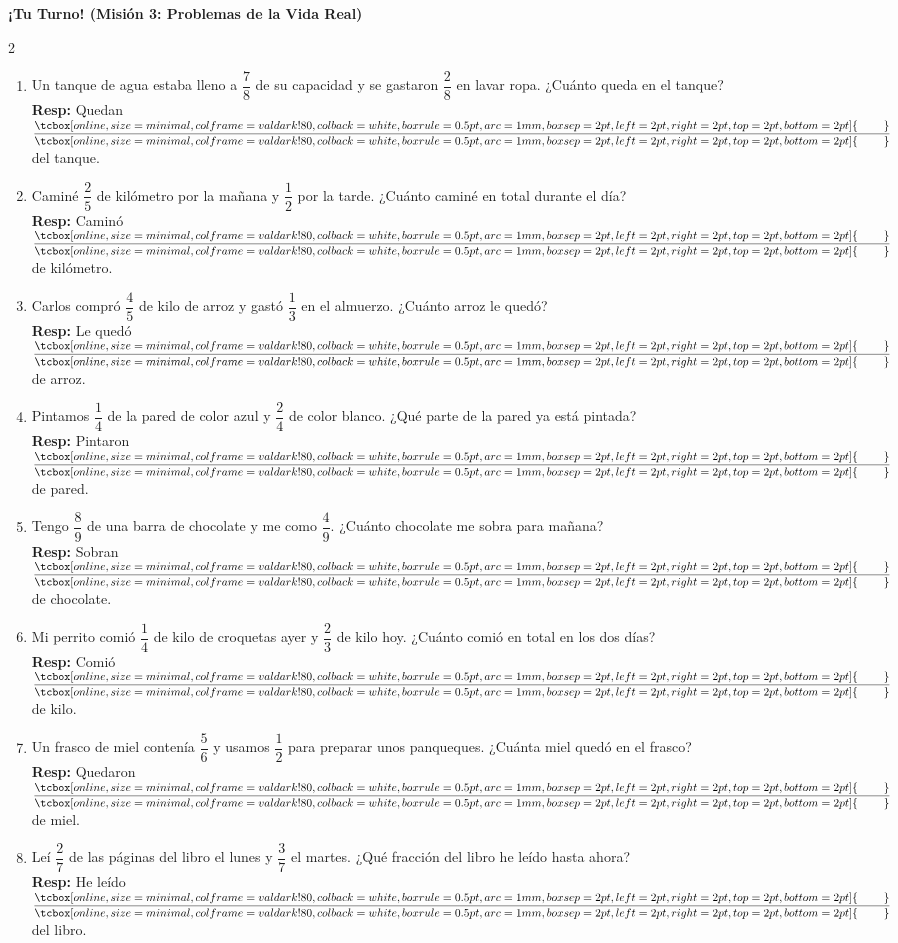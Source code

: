\documentclass[12pt, letterpaper]{article}
\newenvironment{practica}[1]{
	\vspace{0.6cm}
	\begin{tcolorbox}[colback=white, colframe=valdark, boxrule=1pt, borderline west={4pt}{0pt}{valdark!50}, arc=2mm, top=3pt, bottom=3pt]
		\large\bfseries \ding{46} \textbf{¡Tu Turno! (#1)}
	\end{tcolorbox}
	\vspace{0.2cm}
}{
	\vspace{0.4cm}
}
\newcommand{\boxfill}[1][0.6cm]{\tcbox[on line, size=minimal, colframe=valdark!80, colback=white, boxrule=0.5pt, arc=1mm, boxsep=2pt, left=2pt, right=2pt, top=2pt, bottom=2pt]{\makebox[#1]{\vphantom{M}}}}
\begin{document}
\begin{practica}{Misión 3: Problemas de la Vida Real}
\begin{multicols}{2}
\begin{enumerate}[itemsep=1cm, leftmargin=*]
				\item Un tanque de agua estaba lleno a $\dfrac{7}{8}$ de su capacidad y se gastaron $\dfrac{2}{8}$ en lavar ropa. ¿Cuánto queda en el tanque? \\
				\textbf{Resp:} Quedan $\dfrac{\boxfill[0.8cm]}{\boxfill[0.8cm]}$ del tanque.
				
				\item Caminé $\dfrac{2}{5}$ de kilómetro por la mañana y $\dfrac{1}{2}$ por la tarde. ¿Cuánto caminé en total durante el día? \\
				\textbf{Resp:} Caminó $\dfrac{\boxfill[0.8cm]}{\boxfill[0.8cm]}$ de kilómetro.
				
				\item Carlos compró $\dfrac{4}{5}$ de kilo de arroz y gastó $\dfrac{1}{3}$ en el almuerzo. ¿Cuánto arroz le quedó? \\
				\textbf{Resp:} Le quedó $\dfrac{\boxfill[0.8cm]}{\boxfill[0.8cm]}$ de arroz.
				
				\item Pintamos $\dfrac{1}{4}$ de la pared de color azul y $\dfrac{2}{4}$ de color blanco. ¿Qué parte de la pared ya está pintada? \\
				\textbf{Resp:} Pintaron $\dfrac{\boxfill[0.8cm]}{\boxfill[0.8cm]}$ de pared.
				
				\item Tengo $\dfrac{8}{9}$ de una barra de chocolate y me como $\dfrac{4}{9}$. ¿Cuánto chocolate me sobra para mañana? \\
				\textbf{Resp:} Sobran $\dfrac{\boxfill[0.8cm]}{\boxfill[0.8cm]}$ de chocolate.
				
				\item Mi perrito comió $\dfrac{1}{4}$ de kilo de croquetas ayer y $\dfrac{2}{3}$ de kilo hoy. ¿Cuánto comió en total en los dos días? \\
				\textbf{Resp:} Comió $\dfrac{\boxfill[0.8cm]}{\boxfill[0.8cm]}$ de kilo.
				
				\item Un frasco de miel contenía $\dfrac{5}{6}$ y usamos $\dfrac{1}{2}$ para preparar unos panqueques. ¿Cuánta miel quedó en el frasco? \\
				\textbf{Resp:} Quedaron $\dfrac{\boxfill[0.8cm]}{\boxfill[0.8cm]}$ de miel.
				
				\item Leí $\dfrac{2}{7}$ de las páginas del libro el lunes y $\dfrac{3}{7}$ el martes. ¿Qué fracción del libro he leído hasta ahora? \\
				\textbf{Resp:} He leído $\dfrac{\boxfill[0.8cm]}{\boxfill[0.8cm]}$ del libro.
				

\end{enumerate}
\end{multicols}
\end{practica}
\end{document}
